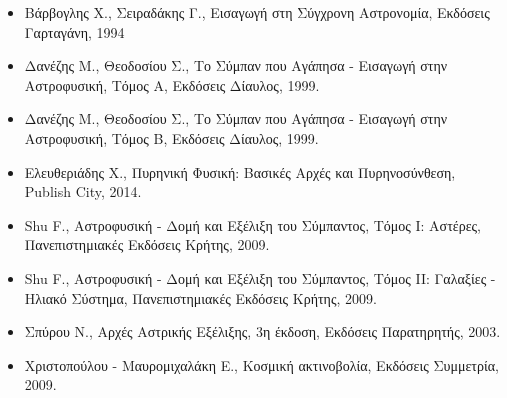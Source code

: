 \begin{itemize}

    \item Βάρβογλης Χ., Σειραδάκης Γ., Εισαγωγή στη Σύγχρονη Αστρονομία, Εκδόσεις Γαρταγάνη, 1994

    \item Δανέζης Μ., Θεοδοσίου Σ., Το Σύμπαν που Αγάπησα - Εισαγωγή στην Αστροφυσική, Τόμος Α, Εκδόσεις Δίαυλος, 1999.
    
    \item Δανέζης Μ., Θεοδοσίου Σ., Το Σύμπαν που Αγάπησα - Εισαγωγή στην Αστροφυσική, Τόμος Β, Εκδόσεις Δίαυλος, 1999.

    \item Ελευθεριάδης Χ., Πυρηνική Φυσική: Βασικές Αρχές και Πυρηνοσύνθεση, Publish City, 2014.
    
    \item Shu F., Αστροφυσική - Δομή και Εξέλιξη του Σύμπαντος, Τόμος I: Αστέρες, Πανεπιστημιακές Εκδόσεις Κρήτης, 2009.
    
    \item Shu F., Αστροφυσική - Δομή και Εξέλιξη του Σύμπαντος, Τόμος II: Γαλαξίες - Ηλιακό Σύστημα, Πανεπιστημιακές Εκδόσεις Κρήτης, 2009.
    
    \item Σπύρου Ν., Αρχές Αστρικής Εξέλιξης, 3η έκδοση, Εκδόσεις Παρατηρητής, 2003.
    
    \item Χριστοπούλου - Μαυρομιχαλάκη Ε., Κοσμική ακτινοβολία, Εκδόσεις Συμμετρία, 2009.
    
\end{itemize}

